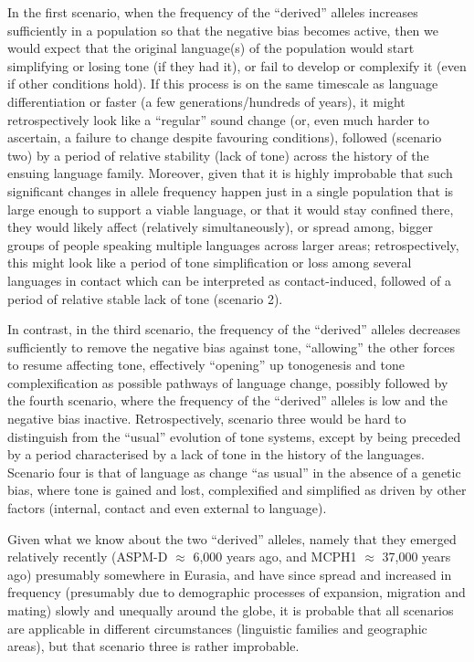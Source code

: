 \documentclass[twoside,onecolumn]{article}
\begin{document}
In the first scenario, when the frequency of the ``derived'' alleles increases sufficiently in a population so that the negative bias becomes active, then we would expect that the original language(s) of the population would start simplifying or losing tone (if they had it), or fail to develop or complexify it (even if other conditions hold).
If this process is on the same timescale as language differentiation or faster (a few generations/hundreds of years), it might retrospectively look like a ``regular'' sound change (or, even much harder to ascertain, a failure to change despite favouring conditions), followed (scenario two) by a period of relative stability (lack of tone) across the history of the ensuing language family.
Moreover, given that it is highly improbable that such significant changes in allele frequency happen just in a single population that is large enough to support a viable language, or that it would stay confined there, they would likely affect (relatively simultaneously), or spread among, bigger groups of people speaking multiple languages across larger areas; retrospectively, this might look like a period of tone simplification or loss among several languages in contact which can be interpreted as contact-induced, followed of a period of relative stable lack of tone (scenario 2).

In contrast, in the third scenario, the frequency of the ``derived'' alleles decreases sufficiently to remove the negative bias against tone, ``allowing'' the other forces to resume affecting tone, effectively ``opening'' up tonogenesis and tone complexification as possible pathways of language change, possibly followed by the fourth scenario, where the frequency of the ``derived'' alleles is low and the negative bias inactive.
Retrospectively, scenario three would be hard to distinguish from the ``usual'' evolution of tone systems, except by being preceded by a period characterised by a lack of tone in the history of the languages.
Scenario four is that of language as change ``as usual'' in the absence of a genetic bias, where tone is gained and lost, complexified and simplified as driven by other factors (internal, contact and even external to language).

Given what we know about the two ``derived'' alleles, namely that they emerged relatively recently (ASPM-D $\approx$ 6,000 years ago, and MCPH1 $\approx$ 37,000 years ago) presumably somewhere in Eurasia, and have since spread and increased in frequency (presumably due to demographic processes of expansion, migration and mating) slowly and unequally around the globe, it is probable that all scenarios are applicable in different circumstances (linguistic families and geographic areas), but that scenario three is rather improbable.
\end{document}
